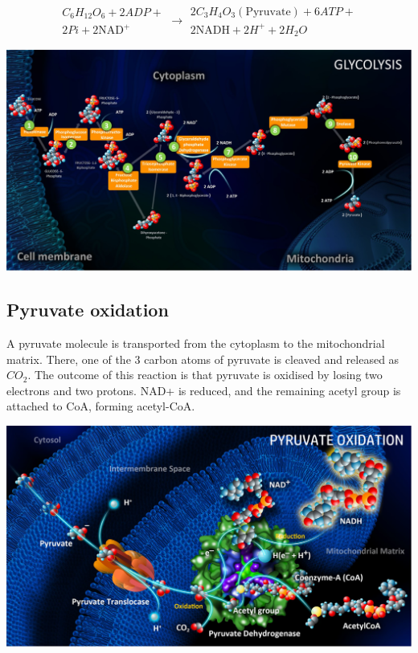 \documentclass[11pt]{article}
\begin{document}
\begin{equation*}
\begin{gathered}
C_6 H_{12} O_6 + 2ADP + \\
2Pi + 2\text{NAD}^+
\end{gathered}
\rightarrow
\begin{gathered}
2C_3H_4O_3 (\text{Pyruvate}) + 6ATP + \\
2\text{NADH} + 2H^+ + 2H_2O
\end{gathered}
\end{equation*}

\begin{center}
\includegraphics[width=.9\linewidth]{./images/glycolysis.png}
\end{center}

\newpage

\subsection{Pyruvate oxidation}
\label{sec:org824df28}
A pyruvate molecule is transported from the cytoplasm to the mitochondrial matrix. There, one of the 3 carbon atoms of pyruvate is cleaved and released as \(CO_2\). The outcome of this reaction is that pyruvate is oxidised by losing two electrons and two protons. NAD+ is reduced, and the remaining acetyl group is attached to CoA, forming acetyl-CoA.
\begin{center}
\includegraphics[width=.9\linewidth]{./images/pyruvate-oxidation.png}
\end{center}
\end{document}

